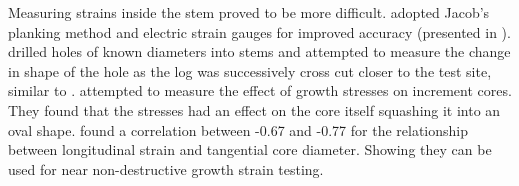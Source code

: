 Measuring strains inside the stem proved to be more difficult. \citet{kikata1972}
adopted Jacob's planking method and electric strain gauges for improved accuracy (presented in \citet{kubler_1987}).
\citet{wilhelmy1973probe} drilled holes of known diameters into stems and
attempted to measure the change in shape of the hole as the log was successively
cross cut closer to the test site, similar to \citet{boyd1950a}. \citet{ISI:A1979HU45700004}  attempted to measure the effect of growth stresses on increment cores.
They found that the stresses had an effect on the core itself
squashing it into an oval shape. \citet{FERRAND_1982} found a correlation between -0.67 and -0.77 for the relationship between
longitudinal strain and tangential core diameter. Showing
they can be used for near non-destructive growth strain testing.